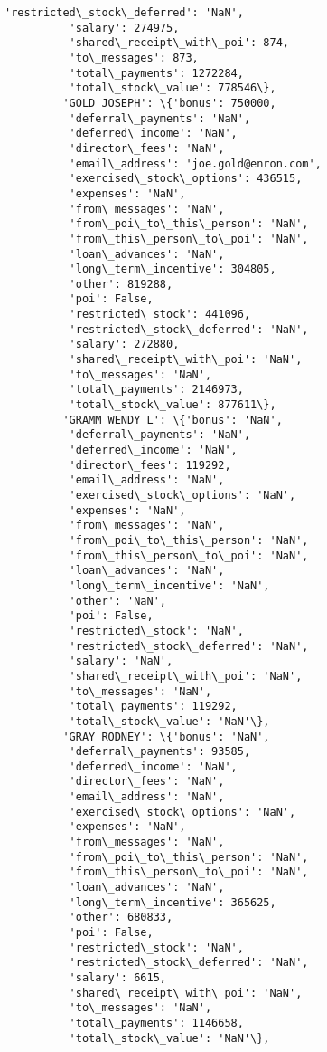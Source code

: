 \documentclass[11pt]{article}
\begin{document}
\begin{Verbatim}[commandchars=\\\{\}]
          'restricted\_stock\_deferred': 'NaN',
          'salary': 274975,
          'shared\_receipt\_with\_poi': 874,
          'to\_messages': 873,
          'total\_payments': 1272284,
          'total\_stock\_value': 778546\},
         'GOLD JOSEPH': \{'bonus': 750000,
          'deferral\_payments': 'NaN',
          'deferred\_income': 'NaN',
          'director\_fees': 'NaN',
          'email\_address': 'joe.gold@enron.com',
          'exercised\_stock\_options': 436515,
          'expenses': 'NaN',
          'from\_messages': 'NaN',
          'from\_poi\_to\_this\_person': 'NaN',
          'from\_this\_person\_to\_poi': 'NaN',
          'loan\_advances': 'NaN',
          'long\_term\_incentive': 304805,
          'other': 819288,
          'poi': False,
          'restricted\_stock': 441096,
          'restricted\_stock\_deferred': 'NaN',
          'salary': 272880,
          'shared\_receipt\_with\_poi': 'NaN',
          'to\_messages': 'NaN',
          'total\_payments': 2146973,
          'total\_stock\_value': 877611\},
         'GRAMM WENDY L': \{'bonus': 'NaN',
          'deferral\_payments': 'NaN',
          'deferred\_income': 'NaN',
          'director\_fees': 119292,
          'email\_address': 'NaN',
          'exercised\_stock\_options': 'NaN',
          'expenses': 'NaN',
          'from\_messages': 'NaN',
          'from\_poi\_to\_this\_person': 'NaN',
          'from\_this\_person\_to\_poi': 'NaN',
          'loan\_advances': 'NaN',
          'long\_term\_incentive': 'NaN',
          'other': 'NaN',
          'poi': False,
          'restricted\_stock': 'NaN',
          'restricted\_stock\_deferred': 'NaN',
          'salary': 'NaN',
          'shared\_receipt\_with\_poi': 'NaN',
          'to\_messages': 'NaN',
          'total\_payments': 119292,
          'total\_stock\_value': 'NaN'\},
         'GRAY RODNEY': \{'bonus': 'NaN',
          'deferral\_payments': 93585,
          'deferred\_income': 'NaN',
          'director\_fees': 'NaN',
          'email\_address': 'NaN',
          'exercised\_stock\_options': 'NaN',
          'expenses': 'NaN',
          'from\_messages': 'NaN',
          'from\_poi\_to\_this\_person': 'NaN',
          'from\_this\_person\_to\_poi': 'NaN',
          'loan\_advances': 'NaN',
          'long\_term\_incentive': 365625,
          'other': 680833,
          'poi': False,
          'restricted\_stock': 'NaN',
          'restricted\_stock\_deferred': 'NaN',
          'salary': 6615,
          'shared\_receipt\_with\_poi': 'NaN',
          'to\_messages': 'NaN',
          'total\_payments': 1146658,
          'total\_stock\_value': 'NaN'\},

\end{Verbatim}
\end{document}
